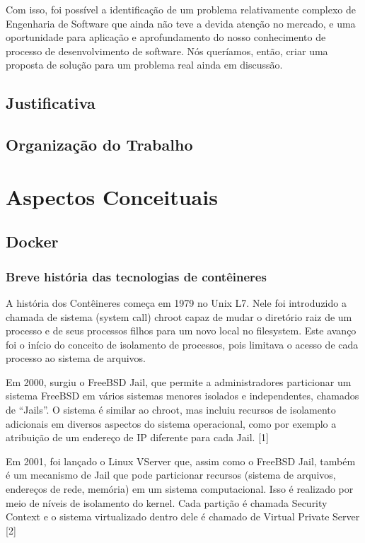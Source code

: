 \documentclass[]{politex}
\begin{document}
	Com isso, foi possível a identificação de um problema relativamente complexo de Engenharia de Software que ainda não teve a devida atenção no mercado, e uma oportunidade para aplicação e aprofundamento do nosso conhecimento de processo de desenvolvimento de software. Nós queríamos, então, criar uma proposta de solução para um problema real ainda em discussão.
	\section{Justificativa}
	
	\section{Organização do Trabalho}
	
\chapter{Aspectos Conceituais}
	\section{Docker}
	\subsection{Breve história das tecnologias de contêineres}
	A história dos Contêineres começa em 1979 no Unix L7. Nele foi introduzido a chamada de sistema (system call) chroot capaz de mudar o diretório raiz de um processo e de seus processos filhos para um novo local no filesystem. Este avanço foi o início do conceito de isolamento de processos, pois limitava o acesso de cada processo ao sistema de arquivos. 

	Em 2000, surgiu o FreeBSD Jail, que permite a administradores particionar um sistema FreeBSD em vários sistemas menores isolados e independentes, chamados de “Jails”. O sistema é similar ao chroot, mas incluiu recursos de isolamento adicionais em diversos aspectos do sistema operacional, como por exemplo a atribuição de um endereço de IP diferente para cada Jail. [1]

	Em 2001, foi lançado o Linux VServer que, assim como o FreeBSD Jail, também é um mecanismo de Jail que pode particionar recursos (sistema de arquivos, endereços de rede, memória) em um sistema computacional. Isso é realizado por meio de níveis de isolamento do kernel. Cada partição é chamada Security Context e o sistema virtualizado dentro dele é chamado de Virtual Private Server [2]
\end{document}
